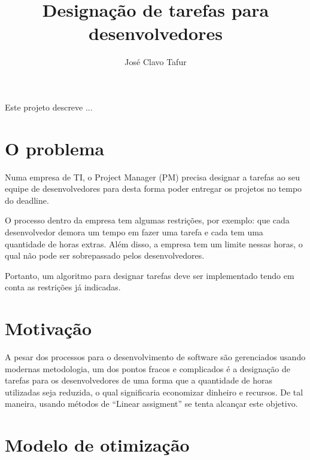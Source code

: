 \documentclass[12pt]{article}
\title{Designação de tarefas para desenvolvedores}
\author{José Clavo Tafur\inst{1} }
\begin{document}
 

\maketitle

\begin{resumo} 
Este projeto descreve ...
\end{resumo}


\section{O problema}\label{section:problem}

Numa empresa de TI, o Project Manager (PM) precisa designar a tarefas ao seu equipe de desenvolvedores para desta forma poder entregar os projetos no tempo do deadline.

O processo dentro da empresa tem algumas restrições, por exemplo: que cada desenvolvedor demora um tempo em fazer uma tarefa e cada tem uma quantidade de horas extras. Além disso, a empresa tem um limite nessas horas, o qual não pode ser sobrepassado pelos desenvolvedores.

Portanto, um algoritmo para designar tarefas deve ser implementado tendo em conta as restrições já indicadas.

\section{Motivação}

A pesar dos processos para o desenvolvimento de software são gerenciados usando modernas metodologia, um dos pontos fracos e complicados é a designação de tarefas para os desenvolvedores de uma forma que a quantidade de horas utilizadas seja reduzida, o qual significaria economizar dinheiro e recursos. De tal maneira, usando métodos de ``Linear assigment'' se tenta alcançar este objetivo. 


\section{Modelo de otimização}\label{section:motivation}
\end{document}
